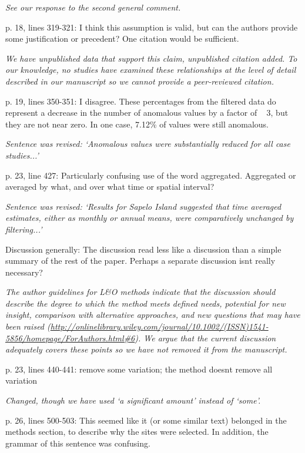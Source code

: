 \documentclass[letterpaper,12pt]{article}\usepackage[]{graphicx}\usepackage[]{color}
\begin{document}
{\it See our response to the second general comment.}

p. 18, lines 319-321: I think this assumption is valid, but can the authors provide some justification or precedent? One citation would be sufficient.

{\it We have unpublished data that support this claim, unpublished citation added.  To our knowledge, no studies have examined these relationships at the level of detail described in our manuscript so we cannot provide a peer-reviewed citation.}

p. 19, lines 350-351: I disagree. These percentages from the filtered data do represent a decrease
in the number of anomalous values by a factor of ~ 3, but they are not near zero. In one case,
7.12\% of values were still anomalous.

{\it Sentence was revised: `Anomalous values were substantially reduced for all case studies...'}

p. 23, line 427: Particularly confusing use of the word aggregated. Aggregated or averaged by
what, and over what time or spatial interval?

{\it Sentence was revised: `Results for Sapelo Island suggested that time averaged estimates, either as monthly or annual means, were comparatively unchanged by filtering...'}

Discussion generally: The discussion read less like a discussion than a simple summary of the rest of the paper. Perhaps a separate discussion isnt really necessary?

{\it The author guidelines for L\&O methods indicate that the discussion should describe the degree to which the method meets defined needs, potential for new insight, comparison with alternative approaches, and new questions that may have been raised (\href{http://onlinelibrary.wiley.com/journal/10.1002/(ISSN)1541-5856/homepage/ForAuthors.html#6}{http://onlinelibrary.wiley.com/journal/10.1002/(ISSN)1541-5856/homepage/ForAuthors.html\#6}).  We argue that the current discussion adequately covers these points so we have not removed it from the manuscript. 
}

p. 23, lines 440-441: remove some variation; the method doesnt remove all variation

{\it Changed, though we have used `a significant amount' instead of `some'.}

p. 26, lines 500-503: This seemed like it (or some similar text) belonged in the methods section, to describe why the sites were selected. In addition, the grammar of this sentence was confusing.
\end{document}
